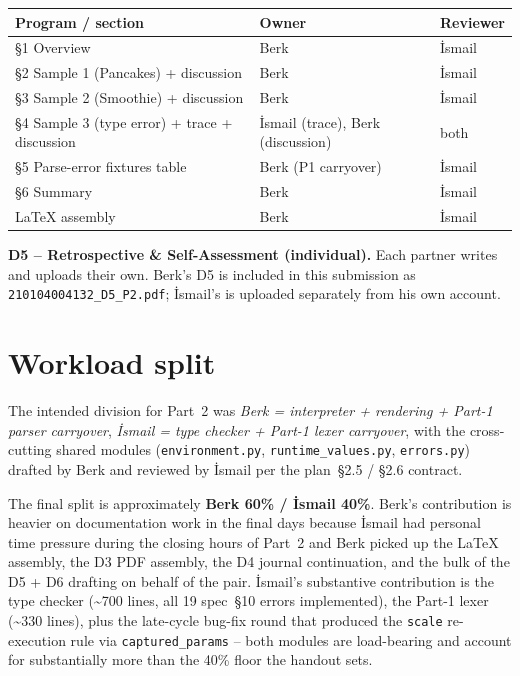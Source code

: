 \documentclass[11pt,a4paper]{article}
\begin{document}
\begin{center}
\small
\begin{tabular}{@{}p{}p{}p{}@{}}
\toprule
\textbf{Program / section} & \textbf{Owner} & \textbf{Reviewer} \\
\midrule
\S1 Overview                                     & Berk              & İsmail \\
\S2 Sample 1 (Pancakes) + discussion             & Berk              & İsmail \\
\S3 Sample 2 (Smoothie) + discussion             & Berk              & İsmail \\
\S4 Sample 3 (type error) + trace + discussion   & İsmail (trace), Berk (discussion) & both \\
\S5 Parse-error fixtures table                   & Berk (P1 carryover) & İsmail \\
\S6 Summary                                      & Berk              & İsmail \\
LaTeX assembly                                   & Berk              & İsmail \\
\bottomrule
\end{tabular}
\end{center}

\noindent\textbf{D5 -- Retrospective \& Self-Assessment (individual).}
Each partner writes and uploads their own. Berk's D5 is included in
this submission as \texttt{210104004132\_D5\_P2.pdf}; İsmail's is
uploaded separately from his own account.

\section{Workload split}

The intended division for Part~2 was \emph{Berk = interpreter +
rendering + Part-1 parser carryover}, \emph{İsmail = type checker +
Part-1 lexer carryover}, with the cross-cutting shared modules
(\texttt{environment.py}, \texttt{runtime\_values.py},
\texttt{errors.py}) drafted by Berk and reviewed by İsmail per the
plan~\S2.5 / \S2.6 contract.

The final split is approximately \textbf{Berk 60\% / İsmail 40\%}.
Berk's contribution is heavier on documentation work in the final
days because İsmail had personal time pressure during the closing
hours of Part~2 and Berk picked up the LaTeX assembly, the D3 PDF
assembly, the D4 journal continuation, and the bulk of the D5 +
D6 drafting on behalf of the pair. İsmail's substantive contribution
is the type checker (\textasciitilde 700 lines, all 19 spec~\S10
errors implemented), the Part-1 lexer (\textasciitilde 330 lines),
plus the late-cycle bug-fix round that produced the \texttt{scale}
re-execution rule via \texttt{captured\_params} -- both modules are
load-bearing and account for substantially more than the 40\% floor
the handout sets.
\end{document}
